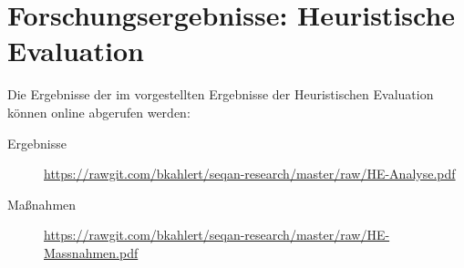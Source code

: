 \chapter{Forschungsergebnisse: Heuristische Evaluation}
\label{app:results}\label{app:he-ergebnisse}\label{app:he-massnahmen}

Die Ergebnisse der im  vorgestellten Ergebnisse der Heuristischen Evaluation können online abgerufen werden:

\begin{description}
  \item[Ergebnisse] \url{https://rawgit.com/bkahlert/seqan-research/master/raw/HE-Analyse.pdf}
  \item[Maßnahmen] \url{https://rawgit.com/bkahlert/seqan-research/master/raw/HE-Massnahmen.pdf}
\end{description}


